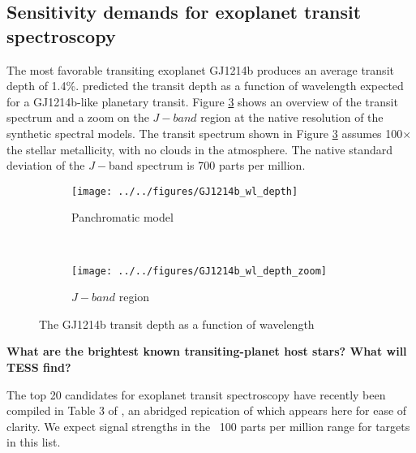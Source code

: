\documentclass[12pt]{article}
\begin{document}
\subsection{Sensitivity demands for exoplanet transit spectroscopy}
The most favorable transiting exoplanet GJ1214b produces an average transit depth of 1.4\%.  \citet{2015ApJ...815..110M} predicted the transit depth as a function of wavelength expected for a GJ1214b-like planetary transit.  Figure \ref{fig:Morley} shows an overview of the transit spectrum and a zoom on the $J-band$ region at the native resolution of the synthetic spectral models.  The transit spectrum shown in Figure \ref{fig:Morley} assumes 100$\times$ the stellar metallicity, with no clouds in the atmosphere.  The native standard deviation of the $J-$band spectrum is 700 parts per million.


\begin{figure}
    \centering
    \begin{subfigure}[b]{0.45\textwidth}
        \texttt{[image: ../../figures/GJ1214b\_wl\_depth]}
        \caption{Panchromatic model}
        \label{fig:GJ1214b_panchromatic}
    \end{subfigure}
    ~ %
    \begin{subfigure}[b]{0.45\textwidth}
        \texttt{[image: ../../figures/GJ1214b\_wl\_depth\_zoom]}
        \caption{$J-band$ region}
        \label{fig:GJ1214b_zoom}
    \end{subfigure}
    \caption{The GJ1214b transit depth as a function of wavelength}\label{fig:Morley}
\end{figure}

\textbf{What are the brightest known transiting-planet host stars? What will TESS find?}

The top 20 candidates for exoplanet transit spectroscopy have recently been compiled in Table 3 of \cite{2017AJ....153..256R}, an abridged repication of which appears here for ease of clarity. We expect signal strengths in the ~100 parts per million range for targets in this list.
\end{document}
